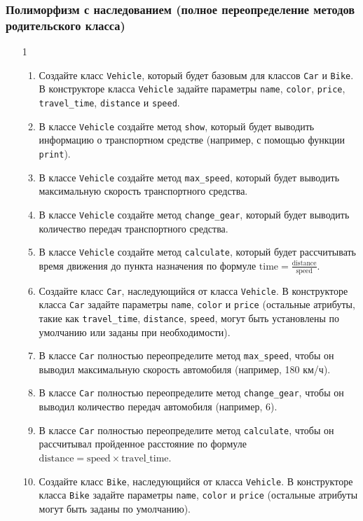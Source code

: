 \subsubsection{Полиморфизм с наследованием (полное переопределение методов родительского класса)}
\begin{enumerate}
\item[1]
\begin{enumerate}[leftmargin=*]
    \item Создайте класс \texttt{Vehicle}, который будет базовым для классов \texttt{Car} и \texttt{Bike}. В конструкторе класса \texttt{Vehicle} задайте параметры \texttt{name}, \texttt{color}, \texttt{price}, \texttt{travel\_time}, \texttt{distance} и \texttt{speed}.
    \item В классе \texttt{Vehicle} создайте метод \texttt{show}, который будет выводить информацию о транспортном средстве (например, с помощью функции \texttt{print}).
    \item В классе \texttt{Vehicle} создайте метод \texttt{max\_speed}, который будет выводить максимальную скорость транспортного средства.
    \item В классе \texttt{Vehicle} создайте метод \texttt{change\_gear}, который будет выводить количество передач транспортного средства.
    \item В классе \texttt{Vehicle} создайте метод \texttt{calculate}, который будет рассчитывать время движения до пункта назначения по формуле \( \text{time} = \frac{\text{distance}}{\text{speed}} \).
    \item Создайте класс \texttt{Car}, наследующийся от класса \texttt{Vehicle}. В конструкторе класса \texttt{Car} задайте параметры \texttt{name}, \texttt{color} и \texttt{price} (остальные атрибуты, такие как \texttt{travel\_time}, \texttt{distance}, \texttt{speed}, могут быть установлены по умолчанию или заданы при необходимости).
    \item В классе \texttt{Car} полностью переопределите метод \texttt{max\_speed}, чтобы он выводил максимальную скорость автомобиля (например, 180 км/ч).
    \item В классе \texttt{Car} полностью переопределите метод \texttt{change\_gear}, чтобы он выводил количество передач автомобиля (например, 6).
    \item В классе \texttt{Car} полностью переопределите метод \texttt{calculate}, чтобы он рассчитывал пройденное расстояние по формуле \( \text{distance} = \text{speed} \times \text{travel\_time} \).
    \item Создайте класс \texttt{Bike}, наследующийся от класса \texttt{Vehicle}. В конструкторе класса \texttt{Bike} задайте параметры \texttt{name}, \texttt{color} и \texttt{price} (остальные атрибуты могут быть заданы по умолчанию).

\end{enumerate}
\end{enumerate}
